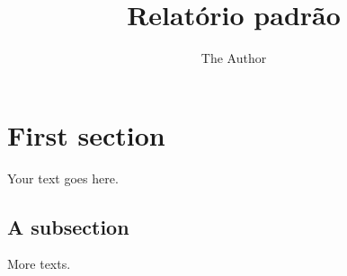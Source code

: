 \documentclass[11pt]{article}
\title{Relatório padrão}
\author{The Author}
\begin{document}
\maketitle

\section{First section}

Your text goes here.

\subsection{A subsection}

More texts.
\end{document}
